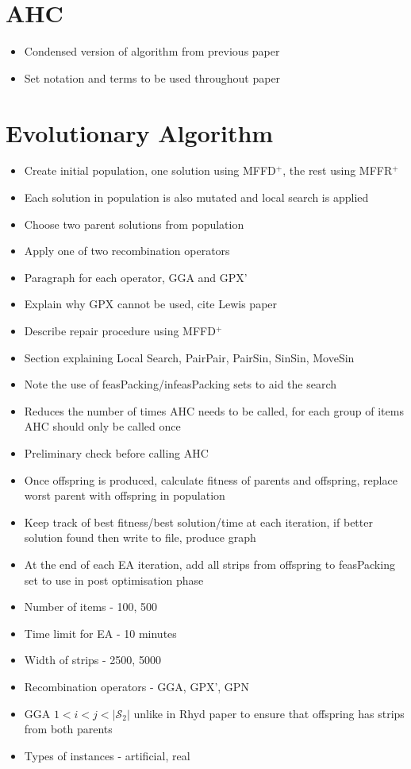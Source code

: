 \documentclass{elsarticle}
\begin{document}
\section{AHC}
\begin{itemize}
	\item Condensed version of algorithm from previous paper
	\item Set notation and terms to be used throughout paper
\end{itemize}


\section{Evolutionary Algorithm}
\begin{itemize}
	\item Create initial population, one solution using MFFD$^+$, the rest using MFFR$^+$
	\item Each solution in population is also mutated and local search is applied
	\item Choose two parent solutions from population
	\item Apply one of two recombination operators
	\item Paragraph for each operator, GGA and GPX'
	\item Explain why GPX cannot be used, cite Lewis paper
	\item Describe repair procedure using MFFD$^+$
	\item Section explaining Local Search, PairPair, PairSin, SinSin, MoveSin
	\item Note the use of feasPacking/infeasPacking sets to aid the search
	\item Reduces the number of times AHC needs to be called, for each group of items AHC should only be called once
	\item Preliminary check before calling AHC
	\item Once offspring is produced, calculate fitness of parents and offspring, replace worst parent with offspring in population
	\item Keep track of best fitness/best solution/time at each iteration, if better solution found then write to file, produce graph
	\item At the end of each EA iteration, add all strips from offspring to feasPacking set to use in post optimisation phase
	\item Number of items - 100, 500
	\item Time limit for EA - 10 minutes
	\item Width of strips - 2500, 5000
	\item Recombination operators - GGA, GPX', GPN
	\item GGA $1 < i < j < |\mathcal{S}_2|$ unlike in Rhyd paper to ensure that offspring has strips from both parents
	\item Types of instances - artificial, real
	

\end{itemize}
\end{document}
